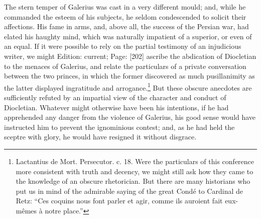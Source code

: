 The stern temper of Galerius was cast in a very different mould; and, while he commanded the esteem of his subjects, he seldom condescended to solicit their affections. His fame in arms, and, above all, the success of the Persian war, had elated his haughty mind, which was naturally impatient of a superior, or even of an equal. If it were possible to rely on the partial testimony of an injudicious writer, we might Edition: current; Page: [202] ascribe the abdication of Diocletian to the menaces of Galerius, and relate the particulars of a private conversation between the two princes, in which the former discovered as much pusillanimity as the latter displayed ingratitude and arrogance.\footnote{Lactantius de Mort. Persecutor. c. 18. Were the particulars of this conference more consistent with truth and decency, we might still ask how they came to the knowledge of an obscure rhetorician. But there are many historians who put us in mind of the admirable saying of the great Condé to Cardinal de Retz: \texthebrew{“}Ces coquins nous font parler et agir, comme ils auroient fait eux-mêmes à notre place.\texthebrew{}”} But these obscure anecdotes are sufficiently refuted by an impartial view of the character and conduct of Diocletian. Whatever might otherwise have been his intentions, if he had apprehended any danger from the violence of Galerius, his good sense would have instructed him to prevent the ignominious contest; and, as he had held the sceptre with glory, he would have resigned it without disgrace.

